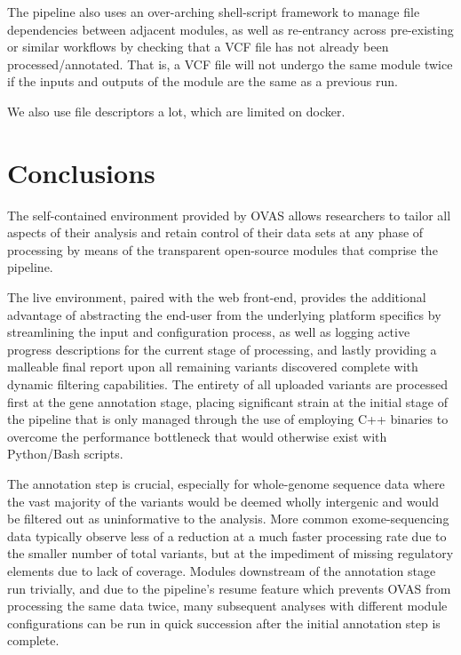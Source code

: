 \documentclass[twocolumn]{bmcart}%
\def\app{OVAS}
\newcommand{\changes}[1]{{\color{red} #1}}
\begin{document}

\changes{The pipeline also uses an over-arching shell-script framework to manage file dependencies between adjacent modules, as well as re-entrancy across pre-existing or similar workflows by checking that a VCF file has not already been processed/annotated. That is, a VCF file will not undergo the same module twice if the inputs and outputs of the module are the same as a previous run.

We also use file descriptors a lot, which are limited on docker.}






\section*{Conclusions}

The self-contained environment provided by \app{} allows researchers to tailor all aspects of their analysis and retain control of their data sets at any phase of processing by means of the transparent open-source modules that comprise the pipeline. 

The live environment, paired with the web front-end, provides the additional advantage of abstracting the end-user from the underlying platform specifics by streamlining the input and configuration process, as well as logging active progress descriptions for the current stage of processing, and lastly providing a malleable final report upon all remaining variants discovered complete with dynamic filtering capabilities. The entirety of all uploaded variants are processed first at the gene annotation stage, placing significant strain at the initial stage of the pipeline that is only managed through the use of employing C++ binaries to overcome the performance bottleneck that would otherwise exist with Python/Bash scripts.

The annotation step is crucial, especially for whole-genome sequence data where the vast majority of the variants would be deemed wholly intergenic and would be filtered out as uninformative to the analysis. More common exome-sequencing data typically observe less of a reduction at a much faster processing rate due to the smaller number of total variants, but at the impediment of missing regulatory elements due to lack of coverage. Modules downstream of the annotation stage run trivially, and due to the pipeline's resume feature which prevents \app{} from processing the same data twice, many subsequent analyses with different module configurations can be run in quick succession after the initial annotation step is complete.
\end{document}
